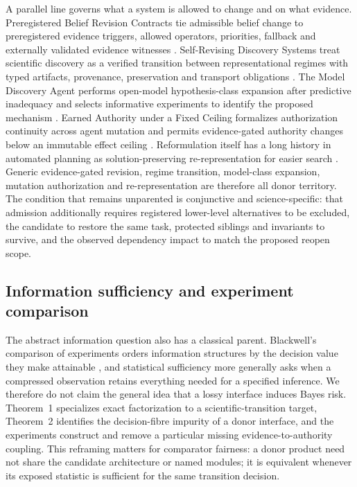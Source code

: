 A parallel line governs what a system is allowed to change and on what evidence.
Preregistered Belief Revision Contracts tie admissible belief change to
preregistered evidence triggers, allowed operators, priorities, fallback and
externally validated evidence witnesses \cite{pbrc2026}. Self-Revising Discovery
Systems treat scientific discovery as a verified transition between
representational regimes with typed artifacts, provenance, preservation and
transport obligations \cite{selfrevisingdiscovery2026}. The Model Discovery
Agent performs open-model hypothesis-class expansion after predictive inadequacy
and selects informative experiments to identify the proposed mechanism
\cite{modeldiscoveryagent2026}. Earned Authority under a Fixed Ceiling
formalizes authorization continuity across agent mutation and permits
evidence-gated authority changes below an immutable effect ceiling
\cite{earnedauthority2026}. Reformulation itself has a long history in automated
planning as solution-preserving re-representation for easier search
\cite{reformulation2023}. Generic evidence-gated revision, regime transition,
model-class expansion, mutation authorization and re-representation are
therefore all donor territory. The condition that remains unparented is
conjunctive and science-specific: that admission additionally requires
registered lower-level alternatives to be excluded, the candidate to restore the
same task, protected siblings and invariants to survive, and the observed
dependency impact to match the proposed reopen scope.

\subsection{Information sufficiency and experiment comparison}

The abstract information question also has a classical parent. Blackwell's
comparison of experiments orders information structures by the decision value
they make attainable \cite{blackwell1953}, and statistical sufficiency more
generally asks when a compressed observation retains everything needed for a
specified inference. We therefore do not claim the general idea that a lossy
interface induces Bayes risk. Theorem~1 specializes exact factorization to a
scientific-transition target, Theorem~2 identifies the decision-fibre impurity
of a donor interface, and the experiments construct and remove a particular
missing evidence-to-authority coupling. This reframing matters for comparator
fairness: a donor product need not share the candidate architecture or named
modules; it is equivalent whenever its exposed statistic is sufficient for the
same transition decision.

